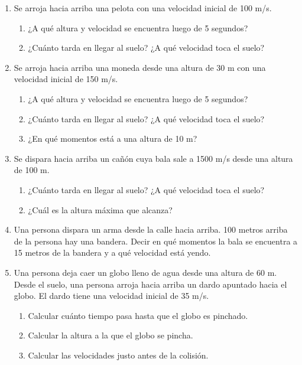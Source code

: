 \begin{enumerate}
\item Se arroja hacia arriba una pelota con una velocidad inicial de 100 m/s. 
\begin{enumerate}
    \item ¿A qué altura y velocidad se encuentra luego de 5 segundos?

    \item ¿Cuánto tarda en llegar al suelo?  ¿A qué velocidad toca el suelo?
\end{enumerate}

\item Se arroja hacia arriba una moneda desde una altura de 30 m con una velocidad inicial de 150 m/s. 
\begin{enumerate}
    \item ¿A qué altura y velocidad se encuentra luego de 5 segundos?

    \item ¿Cuánto tarda en llegar al suelo?  ¿A qué velocidad toca el suelo? %

    \item ¿En qué momentos está a una altura de 10 m? %
\end{enumerate}

\item Se dispara hacia arriba un cañón cuya bala sale a 1500 m/s desde una altura de 100 m. 
\begin{enumerate}
    \item ¿Cuánto tarda en llegar al suelo?  ¿A qué velocidad toca el suelo? %

    \item ¿Cuál es la altura máxima que alcanza?
\end{enumerate}

\item Una persona dispara un arma desde la calle hacia arriba. 100 metros arriba de la persona hay una bandera. Decir en qué momentos la bala se encuentra a 15 metros de la bandera y a qué velocidad está yendo.

\item Una persona deja caer un globo lleno de agua desde una altura de 60 m. Desde
el suelo, una persona arroja hacia arriba
un dardo apuntado hacia el globo. El dardo tiene una velocidad inicial de 35 m/s.
\begin{enumerate}
    \item Calcular cuánto tiempo pasa hasta que el
    globo es pinchado.
    \item Calcular la altura a la que el globo se pincha.
    \item Calcular las velocidades justo antes de la colisión.
\end{enumerate}


\end{enumerate}

